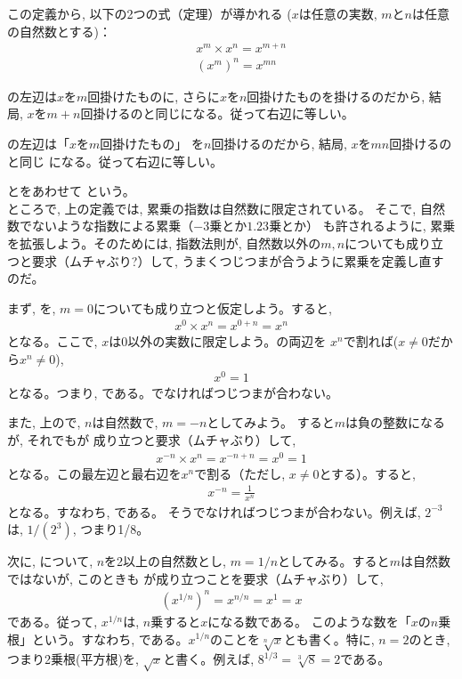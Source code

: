 この定義から, 以下の2つの式（定理）が導かれる
($x$は任意の実数, $m$と$n$は任意の自然数とする)：
\begin{eqnarray}
&&x^m\times x^n=x^{m+n}\label{eq:sisu01}\\
&&(x^m)^n=x^{mn}\label{eq:sisu02}
\end{eqnarray}

の左辺は$x$を$m$回掛けたものに, 
さらに$x$を$n$回掛けたものを掛けるのだから, 結局, 
$x$を$m+n$回掛けるのと同じになる。従って右辺に等しい。

の左辺は「$x$を$m$回掛けたもの」
を$n$回掛けるのだから, 結局, $x$を$mn$回掛けるのと同じ
になる。従って右辺に等しい。

とをあわせて
という。\\

ところで, 上の定義では, 累乗の指数は自然数に限定されている。
そこで, 自然数でないような指数による累乗（$-3$乗とか$1.23$乗とか）
も許されるように, 累乗を拡張しよう。そのためには, 指数法則が, 
自然数以外の$m, n$についても成り立つと要求（ムチャぶり?）して, 
うまくつじつまが合うように累乗を定義し直すのだ。

まず, を, $m=0$についても成り立つと仮定しよう。すると, 
\begin{eqnarray}
x^0\times x^n=x^{0+n}=x^n\label{eq:sisu015}
\end{eqnarray}
となる。ここで, $x$は0以外の実数に限定しよう。の両辺を
$x^n$で割れば($x\neq0$だから$x^n\neq0$), 
\begin{eqnarray}
x^0=1 
\end{eqnarray}
となる。つまり, である。でなければつじつまが合わない。

また, 上ので, $n$は自然数で, $m=-n$としてみよう。
すると$m$は負の整数になるが, それでもが
成り立つと要求（ムチャぶり）して, 
\begin{eqnarray}x^{-n}\times x^n=x^{-n+n}=x^0=1\end{eqnarray}
となる。この最左辺と最右辺を$x^n$で割る（ただし, $x\neq 0$とする）。すると, 
\begin{eqnarray}
x^{-n}=\frac{1}{x^n}\label{eq:xpowminus}
\end{eqnarray}
となる。すなわち, である。
そうでなければつじつまが合わない。例えば, $2^{-3}$は, $1/(2^3)$, 
つまり1/8。

次に, について, $n$を2以上の自然数とし, 
$m=1/n$としてみる。すると$m$は自然数ではないが, このときも
が成り立つことを要求（ムチャぶり）して, 
\begin{eqnarray}
(x^{1/n})^n=x^{n/n}=x^1=x
\end{eqnarray}
である。従って, $x^{1/n}$は, $n$乗すると$x$になる数である。
このような数を「$x$の$n$乗根」という。すなわち, 
である。$x^{1/n}$のことを$\sqrt[n]{x}$とも書く。特に, $n=2$のとき, 
つまり2乗根(平方根)を, $\sqrt{x}$と書く。例えば, 
$8^{1/3}=\sqrt[3]{8}=2$である。

